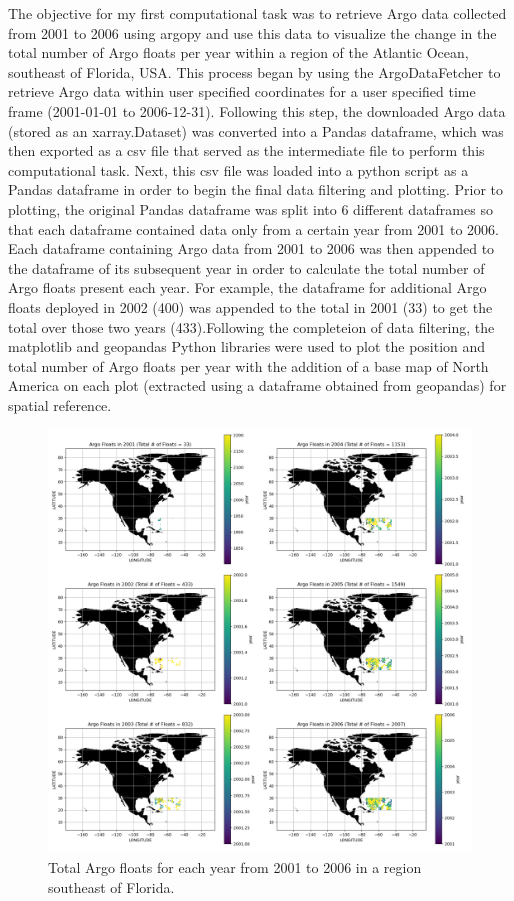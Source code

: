 \documentclass{article}
\begin{document}
The objective for my first computational task was to retrieve Argo data collected from 2001 to 2006 using argopy and use this data to visualize the change in the total number of Argo floats per year within a region of the Atlantic Ocean, southeast of Florida, USA. This process began by using the ArgoDataFetcher to retrieve Argo data within user specified coordinates for a user specified time frame (2001-01-01 to 2006-12-31). Following this step, the downloaded Argo data (stored as an xarray.Dataset) was converted into a Pandas dataframe, which was then exported as a csv file that served as the intermediate file to perform this computational task. Next, this csv file was loaded into a python script as a Pandas dataframe in order to begin the final data filtering and plotting. Prior to plotting, the original Pandas dataframe was split into 6 different dataframes so that each dataframe contained data only from a certain year from 2001 to 2006. Each dataframe containing Argo data from 2001 to 2006 was then appended to the dataframe of its subsequent year in order to calculate the total number of Argo floats present each year. For example, the dataframe for additional Argo floats deployed in 2002 (400) was appended to the total in 2001 (33) to get the total over those two years (433).Following the completeion of data filtering, the matplotlib and geopandas Python libraries were used to plot the position and total number of Argo floats per year with the addition of a base map of North America on each plot (extracted using a dataframe obtained from geopandas) for spatial reference.

\begin{figure}
\includegraphics[width=\textwidth,height=\textheight,keepaspectratio]{total_argo.png}
\caption{Total Argo floats for each year from 2001 to 2006 in a region southeast of Florida.}
 
\end{figure}
\end{document}
